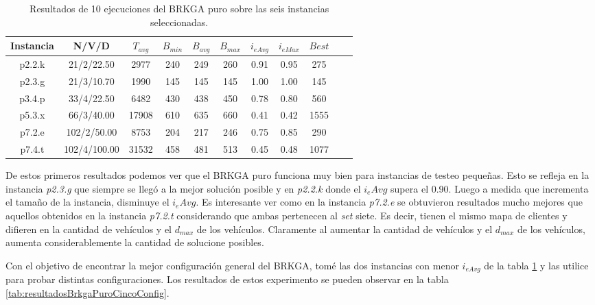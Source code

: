 \begin{table}
\begin{center}
\begin{tabular}{ |c|c|c|c|c|c|c|c|c|c|c| } 
\hline
Instancia & N/V/D & $T_{avg}$ & $B_{min}$ & $B_{avg}$ & $B_{max}$ & $i_{eAvg}$ & $i_{eMax}$ & $Best$ \\
\hline
p2.2.k & 21/2/22.50 & 2977 & 240 & 249 & 260 & 0.91 & 0.95 & 275 \\
p2.3.g & 21/3/10.70 & 1990 & 145 & 145 & 145 & 1.00 & 1.00 & 145 \\
p3.4.p & 33/4/22.50 & 6482 & 430 & 438 & 450 & 0.78 & 0.80 & 560 \\
p5.3.x & 66/3/40.00 & 17908 & 610 & 635 & 660 & 0.41 & 0.42 & 1555 \\
p7.2.e & 102/2/50.00 & 8753 & 204 & 217 & 246 & 0.75 & 0.85 & 290 \\
p7.4.t & 102/4/100.00 & 31532 & 458 & 481 & 513 & 0.45 & 0.48 & 1077 \\
\hline
\end{tabular}
\end{center}
\caption{Resultados de 10 ejecuciones del BRKGA puro sobre las seis instancias seleccionadas.}
\label{tab:resultadosBrkgaPuro}
\end{table}

\bigskip

De estos primeros resultados podemos ver que el BRKGA puro funciona muy bien para instancias de testeo pequeñas. Esto se refleja en la instancia \textit{p2.3.g} que siempre se llegó a la mejor solución posible y en \textit{p2.2.k} donde el $i_eAvg$ supera el 0.90. Luego a medida que incrementa el tamaño de la instancia, disminuye el $i_eAvg$. Es interesante ver como en la instancia \textit{p7.2.e} se obtuvieron resultados mucho mejores que aquellos obtenidos en la instancia \textit{p7.2.t} considerando que ambas pertenecen al \textit{set} siete. Es decir, tienen el mismo mapa de clientes y difieren en la cantidad de vehículos y el $d_{max}$ de los vehículos. Claramente al aumentar la cantidad de vehículos y el $d_{max}$ de los vehículos, aumenta considerablemente la cantidad de solucione posibles.

\bigskip

Con el objetivo de encontrar la mejor configuración general del BRKGA, tomé las dos instancias con menor $i_{eAvg}$ de la tabla \ref{tab:resultadosBrkgaPuro} y las utilice para probar distintas configuraciones. Los resultados de estos experimento se pueden observar en la tabla \ref{tab:resultadosBrkgaPuroCincoConfig}.

